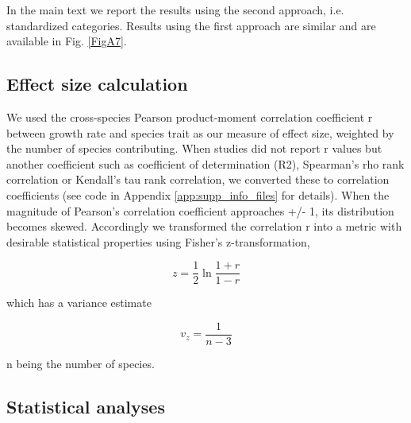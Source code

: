 \documentclass[a4paper]{article}\usepackage[]{graphicx}\usepackage[]{color}
\begin{document}
In the main text we report the results using the second approach, i.e. standardized categories. Results using the first approach are similar and are available in Fig. \ref{FigA7}.

\subsection*{Effect size calculation}\label{effect-size-calculation}

We used the cross-species Pearson product-moment correlation coefficient r between growth rate and species trait as our measure of effect size, weighted by the number of species contributing. When studies did not report r values but another coefficient such as coefficient of determination (R2), Spearman's rho rank correlation or Kendall's tau rank correlation, we converted these to correlation coefficients  \citep{Lajeunesse:2013tm} (see code in Appendix \ref{app:supp_info_files} for details). When the magnitude of Pearson's correlation coefficient approaches +/- 1, its distribution becomes skewed. Accordingly we transformed the correlation r into a metric with desirable statistical properties using Fisher's z-transformation,

\[ z = \frac{1}{2} \ln \frac{1+r}{1-r} \]

which has a variance estimate

\[ v_z= \frac{1}{n-3} \]

n being the number of species.

\subsection*{Statistical analyses}\label{statistical-analyses}
\end{document}
